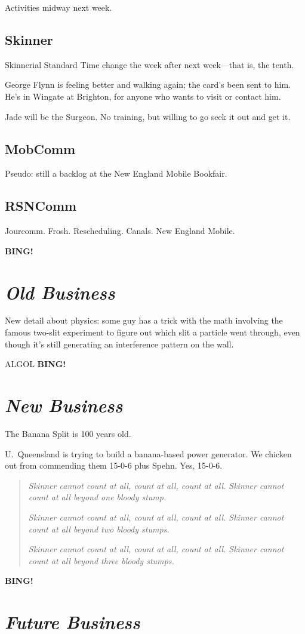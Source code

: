\documentclass[10pt]{article}
\newcommand{\bing}{{\bf BING!} }
\newcommand{\goto}[1]{\bing \vskip 12pt \section*{{\em{#1}}}}
\newcommand{\ps}{ plus Spehn\xspace}
\begin{document}
Activities midway next week.

\subsection*{Skinner}

Skinnerial Standard Time change the week after next week---that is,
the tenth.

George Flynn is feeling better and walking again; the card's been sent
to him.  He's in Wingate at Brighton, for anyone who wants to visit
or contact him.

Jade will be the Surgeon.  No training, but willing to go seek it out
and get it.

\subsection*{MobComm}

Pseudo: still a backlog at the New England Mobile Bookfair.

\subsection*{RSNComm}
Jourcomm.  Frosh.  Rescheduling.  Canals.  New England Mobile.

\goto{Old Business}

New detail about physics: some guy has a trick with the math involving
the famous two-slit experiment to figure out which slit a particle
went through, even though it's still generating an interference
pattern on the wall.

ALGOL
\goto{New Business}
The Banana Split is 100 years old.

U.~Queensland is trying to build a banana-based power generator.
We chicken out from commending them 15-0-6\ps.  Yes, 15-0-6.

\begin{quotation}
  \emph{Skinner cannot count at all, count at all, count at all.  Skinner
  cannot count at all beyond one bloody stump.}
  
  \emph{Skinner cannot count at all, count at all, count at all.  Skinner
  cannot count at all beyond two bloody stumps.}
  
  \emph{Skinner cannot count at all, count at all, count at all.  Skinner
  cannot count at all beyond three bloody stumps.}
\end{quotation}

\goto{Future Business}
\end{document}

